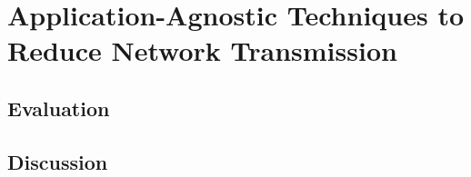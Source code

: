 \chapter{Application-Agnostic Techniques to Reduce Network Transmission}


\section{Evaluation}
\section{Discussion}